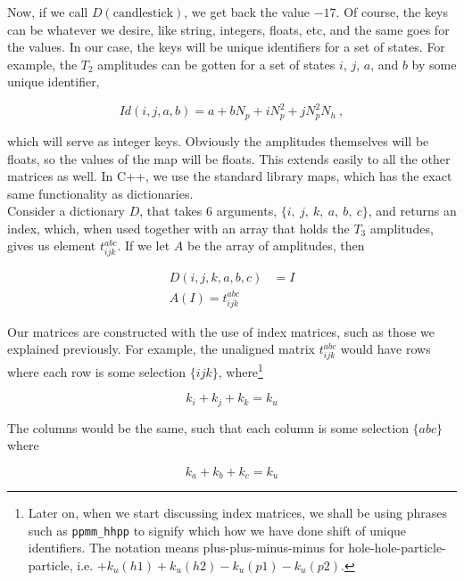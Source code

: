 \documentclass[10pt,twoside]{report}
\begin{document}
	Now, if we call $D(\text{candlestick})$, we get back the value $-17$. Of course, the keys can be whatever we desire, like string, integers, floats, etc, and the same goes for the values. In our case, the keys will be unique identifiers for a set of states. For example, the $T_2$ amplitudes can be gotten for a set of states $i$, $j$, $a$, and $b$ by some unique identifier, 
	
	\begin{equation}
		Id(i,j,a,b) = a + bN_p + iN_p^2 + jN_p^2N_h\:,
	\end{equation}
	
	which will serve as integer keys. Obviously the amplitudes themselves will be floats, so the values of the map will be floats. This extends easily to all the other matrices as well. In C++, we use the standard library maps, which has the exact same functionality as dictionaries.\\
	
	Consider a dictionary $D$, that takes 6 arguments, $\{i,\:j,\:k,\:a,\:b,\:c\}$, and returns an index, which, when used together with an array that holds the $T_3$ amplitudes, gives us element $t_{ijk}^{abc}$. If we let $A$ be the array of amplitudes, then
	
	\begin{align}
	D(i,j,k,a,b,c) &= I \\
	A(I) = t_{ijk}^{abc}
	\label{Implementation | eq | "T3 element retrieval"}
	\end{align}
	
	Our matrices are constructed with the use of index matrices, such as those we explained previously. For example, the unaligned matrix $t_{ijk}^{abc}$ would have rows where each row is some selection $\{ijk\}$, where\footnote{Later on, when we start discussing index matrices, we shall be using phrases such as \texttt{ppmm\_hhpp} to signify which how we have done shift of unique identifiers. The notation means plus-plus-minus-minus for hole-hole-particle-particle, i.e. $+k_u(h1)+k_u(h2)-k_u(p1)-k_u(p2)$.}
	
	\begin{equation}
	k_i+k_j+k_k = k_u
	\end{equation}
	
	The columns would be the same, such that each column is some selection $\{abc\}$ where
	
	\begin{equation}
	k_a+k_b+k_c = k_u
	\end{equation}
	
\end{document}
